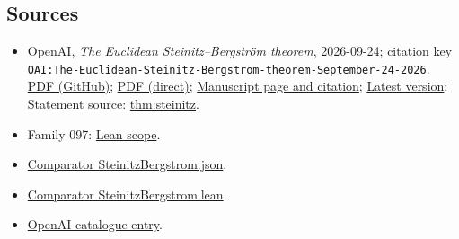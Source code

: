 \documentclass[11pt]{article}
\begin{document}
\subsection{Sources}
\begin{itemize}
\item OpenAI, \emph{The Euclidean Steinitz–Bergström theorem}, 2026-09-24; citation key \texttt{OAI:The-Euclidean-Steinitz-Bergstrom-theorem-September-24-2026}. \href{https://github.com/openai/math/blob/adc7f1241b42e322a6451854ab7e4b4c146bf78a/preprints/The-Euclidean-Steinitz-Bergstrom-theorem-September-24-2026/The-Euclidean-Steinitz-Bergstrom-theorem-September-24-2026.pdf}{PDF (GitHub)}; \href{https://github.com/openai/math/raw/adc7f1241b42e322a6451854ab7e4b4c146bf78a/preprints/The-Euclidean-Steinitz-Bergstrom-theorem-September-24-2026/The-Euclidean-Steinitz-Bergstrom-theorem-September-24-2026.pdf}{PDF (direct)}; \href{https://github.com/openai/math/blob/adc7f1241b42e322a6451854ab7e4b4c146bf78a/preprints/The-Euclidean-Steinitz-Bergstrom-theorem-September-24-2026/README.md}{Manuscript page and citation}; \href{https://github.com/openai/math/blob/main/preprints/The-Euclidean-Steinitz-Bergstrom-theorem-September-24-2026/The-Euclidean-Steinitz-Bergstrom-theorem-September-24-2026.pdf}{Latest version}; Statement source: \href{https://github.com/openai/math/blob/adc7f1241b42e322a6451854ab7e4b4c146bf78a/preprints/The-Euclidean-Steinitz-Bergstrom-theorem-September-24-2026/build/introduction.tex\#L35}{thm:steinitz}.
\item Family 097: \href{https://github.com/openai/math/blob/adc7f1241b42e322a6451854ab7e4b4c146bf78a/lean/docs/097.md}{Lean scope}.
\item \href{https://github.com/openai/math/blob/adc7f1241b42e322a6451854ab7e4b4c146bf78a/lean/ComparatorChallenges/SteinitzBergstrom.json}{Comparator SteinitzBergstrom.json}.
\item \href{https://github.com/openai/math/blob/adc7f1241b42e322a6451854ab7e4b4c146bf78a/lean/ComparatorChallenges/SteinitzBergstrom.lean}{Comparator SteinitzBergstrom.lean}.
\item \href{https://github.com/openai/math/blob/adc7f1241b42e322a6451854ab7e4b4c146bf78a/CONTENTS.md}{OpenAI catalogue entry}.
\end{itemize}
\end{document}
